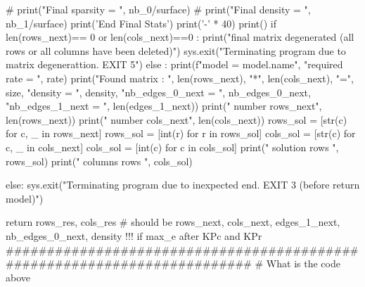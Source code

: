         # print("Final sparsity = ", nb_0/surface)
        # print("Final density = ", nb_1/surface)
        print('End Final Stats')
        print('-' * 40)
        print()
        if len(rows_next)== 0 or len(cols_next)==0 : 
            print("final matrix degenerated (all rows or all columns have been deleted)")
            sys.exit("Terminating program due to matrix degenerattion. EXIT 5")
        else : 
                print(f"model = {model.name}", "required rate =   ", rate)
                print("Found matrix : ", len(rows_next), "*", len(cols_next), "=", size, "density = ", density, "nb_edges_0_next  = ", nb_edges_0_next, "nb_edges_1_next  = ", len(edges_1_next))
                print(" number rows_next", len(rows_next))
                print(" number cols_next", len(cols_next))
                rows_sol = [str(c) for c, _ in rows_next]
                rows_sol = [int(r) for r in rows_sol]
                cols_sol = [str(c) for c, _ in cols_next]
                cols_sol = [int(c) for c in cols_sol]
                print(" solution rows ", rows_sol)
                print(" columns rows ", cols_sol)

    else: 
        sys.exit("Terminating program due to inexpected end. EXIT 3 (before return  model)")
  
    return rows_res, cols_res # should be    rows_next, cols_next, edges_1_next, nb_edges_0_next, density !!! if max_e after KPc and KPr
#########################################################################
#  What is the code above 